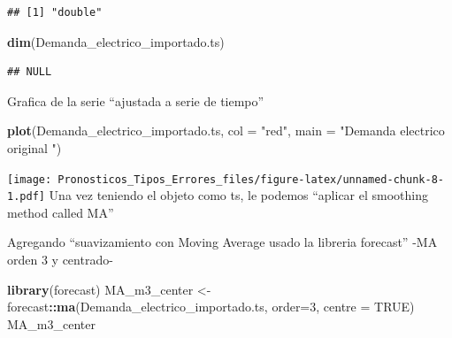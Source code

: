\documentclass[
]{article}
\newenvironment{Shaded}{\begin{snugshade}}{\end{snugshade}}
\newcommand{\AttributeTok}[1]{\textcolor[rgb]{0.13,0.29,0.53}{#1}}
\newcommand{\ConstantTok}[1]{\textcolor[rgb]{0.56,0.35,0.01}{#1}}
\newcommand{\DecValTok}[1]{\textcolor[rgb]{0.00,0.00,0.81}{#1}}
\newcommand{\FunctionTok}[1]{\textcolor[rgb]{0.13,0.29,0.53}{\textbf{#1}}}
\newcommand{\NormalTok}[1]{#1}
\newcommand{\OtherTok}[1]{\textcolor[rgb]{0.56,0.35,0.01}{#1}}
\newcommand{\SpecialCharTok}[1]{\textcolor[rgb]{0.81,0.36,0.00}{\textbf{#1}}}
\newcommand{\StringTok}[1]{\textcolor[rgb]{0.31,0.60,0.02}{#1}}
\begin{document}
\begin{verbatim}
## [1] "double"
\end{verbatim}

\begin{Shaded}
\begin{Highlighting}[]
\FunctionTok{dim}\NormalTok{(Demanda\_electrico\_importado.ts)}
\end{Highlighting}
\end{Shaded}

\begin{verbatim}
## NULL
\end{verbatim}

Grafica de la serie ``ajustada a serie de tiempo''

\begin{Shaded}
\begin{Highlighting}[]
\FunctionTok{plot}\NormalTok{(Demanda\_electrico\_importado.ts, }\AttributeTok{col =} \StringTok{"red"}\NormalTok{, }\AttributeTok{main =} \StringTok{"Demanda electrico \textquotesingle{}original\textquotesingle{} "}\NormalTok{)}
\end{Highlighting}
\end{Shaded}

\texttt{[image: Pronosticos\_Tipos\_Errores\_files/figure-latex/unnamed-chunk-8-1.pdf]}
Una vez teniendo el objeto como ts, le podemos ``aplicar el smoothing
method called MA''

Agregando ``suavizamiento con Moving Average usado la libreria
forecast'' -MA orden 3 y centrado-

\begin{Shaded}
\begin{Highlighting}[]
\FunctionTok{library}\NormalTok{(forecast)}
\NormalTok{MA\_m3\_center }\OtherTok{\textless{}{-}}\NormalTok{ forecast}\SpecialCharTok{::}\FunctionTok{ma}\NormalTok{(Demanda\_electrico\_importado.ts, }\AttributeTok{order=}\DecValTok{3}\NormalTok{, }\AttributeTok{centre =} \ConstantTok{TRUE}\NormalTok{)}
\NormalTok{MA\_m3\_center}
\end{Highlighting}
\end{Shaded}
\end{document}
